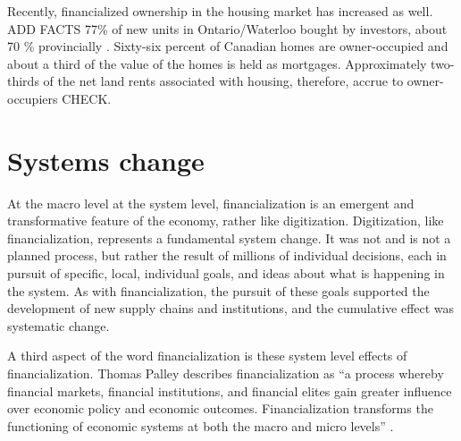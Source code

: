Recently, financialized ownership in the housing market has increased as well.
ADD FACTS 77\% of new units in Ontario/Waterloo bought by investors, about 70 \% provincially \cite{}.
Sixty-six percent of Canadian homes are owner-occupied and about a third of the value of the homes is held as mortgages. Approximately two-thirds of the net land rents associated with housing, therefore, accrue to owner-occupiers \cite{nemtinFinancializationHousingSocial2021} CHECK. %

\section{Systems change}
At the macro level at the system level, financialization is an emergent and transformative feature of the economy, rather like digitization. Digitization, like financialization, represents a fundamental  system  change. It was not and is not a planned process, but rather the result of millions of individual decisions, each in pursuit of specific, local, individual goals, and ideas about what is happening in the system.  As with financialization, the pursuit of these goals supported the development of new supply chains and institutions, and %
the cumulative effect was systematic change. 

A third aspect of the word financialization is these system level effects of financialization. Thomas Palley describes financialization as ``a process whereby financial markets, financial institutions, and financial elites gain greater influence over economic policy and economic outcomes. Financialization transforms the functioning of economic systems at both the macro and micro levels'' \cite{palleyFinancializationWhatIt2007}. 

